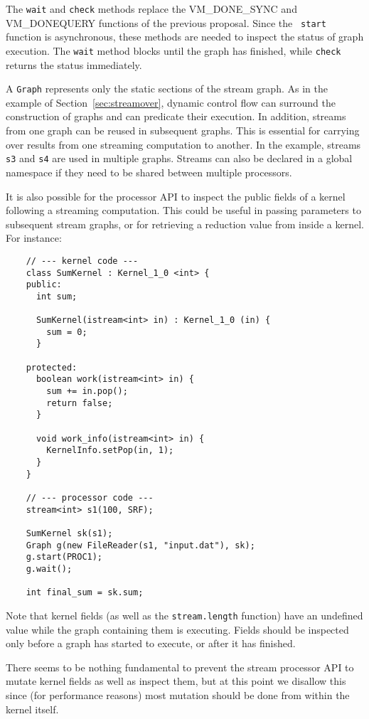 The {\tt wait} and {\tt check} methods replace the VM\_DONE\_SYNC and
VM\_DONEQUERY functions of the previous proposal.  Since the {\tt
start} function is asynchronous, these methods are needed to inspect
the status of graph execution.  The {\tt wait} method blocks until the
graph has finished, while {\tt check} returns the status immediately.


A {\tt Graph} represents only the static sections of the stream graph.
As in the example of Section~\ref{sec:streamover}, dynamic control
flow can surround the construction of graphs and can predicate their
execution.  In addition, streams from one graph can be reused in
subsequent graphs.  This is essential for carrying over results from
one streaming computation to another.  In the example, streams {\tt
s3} and {\tt s4} are used in multiple graphs.  Streams can also be
declared in a global namespace if they need to be shared between
multiple processors.

It is also possible for the processor API to inspect the public
fields of a kernel following a streaming computation.  This could be
useful in passing parameters to subsequent stream graphs, or for
retrieving a reduction value from inside a kernel.  For instance:
{\small
\begin{verbatim}
    // --- kernel code ---
    class SumKernel : Kernel_1_0 <int> {
    public:
      int sum;

      SumKernel(istream<int> in) : Kernel_1_0 (in) {
        sum = 0;
      }

    protected:
      boolean work(istream<int> in) {
        sum += in.pop();
        return false;
      }

      void work_info(istream<int> in) {
        KernelInfo.setPop(in, 1);
      }
    }

    // --- processor code ---
    stream<int> s1(100, SRF);

    SumKernel sk(s1);
    Graph g(new FileReader(s1, "input.dat"), sk);
    g.start(PROC1);
    g.wait();

    int final_sum = sk.sum;
\end{verbatim}}

Note that kernel fields (as well as the {\tt stream.length} function)
have an undefined value while the graph containing them is executing.
Fields should be inspected only before a graph has started to execute,
or after it has finished.

There seems to be nothing fundamental to prevent the stream processor
API to mutate kernel fields as well as inspect them, but at this point
we disallow this since (for performance reasons) most mutation should
be done from within the kernel itself.

